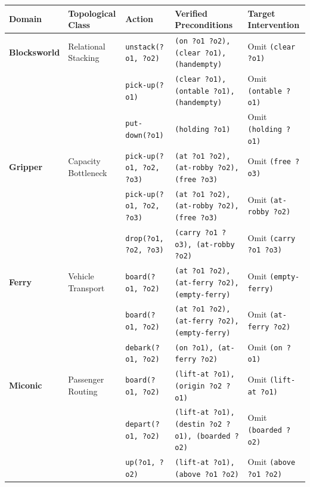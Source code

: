 \documentclass[11pt,a4paper]{article}
\theoremstyle{definition}
\begin{document}
\begin{table}[h!]
\centering
\scriptsize
\begin{tabular}{lllll}
\toprule
\textbf{Domain} & \textbf{Topological Class} & \textbf{Action} & \textbf{Verified Preconditions} & \textbf{Target Intervention} \\
\midrule
\textbf{Blocksworld} & Relational Stacking & \texttt{unstack(?o1, ?o2)} & \texttt{(on ?o1 ?o2), (clear ?o1), (handempty)} & Omit \texttt{(clear ?o1)} \\
                     &                     & \texttt{pick-up(?o1)}       & \texttt{(clear ?o1), (ontable ?o1), (handempty)} & Omit \texttt{(ontable ?o1)} \\
                     &                     & \texttt{put-down(?o1)}      & \texttt{(holding ?o1)}                          & Omit \texttt{(holding ?o1)} \\
\midrule
\textbf{Gripper}     & Capacity Bottleneck & \texttt{pick-up(?o1, ?o2, ?o3)}& \texttt{(at ?o1 ?o2), (at-robby ?o2), (free ?o3)}& Omit \texttt{(free ?o3)} \\
                     &                     & \texttt{pick-up(?o1, ?o2, ?o3)}& \texttt{(at ?o1 ?o2), (at-robby ?o2), (free ?o3)}& Omit \texttt{(at-robby ?o2)} \\
                     &                     & \texttt{drop(?o1, ?o2, ?o3)}& \texttt{(carry ?o1 ?o3), (at-robby ?o2)}        & Omit \texttt{(carry ?o1 ?o3)} \\
\midrule
\textbf{Ferry}       & Vehicle Transport   & \texttt{board(?o1, ?o2)}    & \texttt{(at ?o1 ?o2), (at-ferry ?o2), (empty-ferry)} & Omit \texttt{(empty-ferry)} \\
                     &                     & \texttt{board(?o1, ?o2)}    & \texttt{(at ?o1 ?o2), (at-ferry ?o2), (empty-ferry)} & Omit \texttt{(at-ferry ?o2)} \\
                     &                     & \texttt{debark(?o1, ?o2)}   & \texttt{(on ?o1), (at-ferry ?o2)}               & Omit \texttt{(on ?o1)} \\
\midrule
\textbf{Miconic}     & Passenger Routing   & \texttt{board(?o1, ?o2)}    & \texttt{(lift-at ?o1), (origin ?o2 ?o1)}        & Omit \texttt{(lift-at ?o1)} \\
                     &                     & \texttt{depart(?o1, ?o2)}   & \texttt{(lift-at ?o1), (destin ?o2 ?o1), (boarded ?o2)} & Omit \texttt{(boarded ?o2)} \\
                     &                     & \texttt{up(?o1, ?o2)}       & \texttt{(lift-at ?o1), (above ?o1 ?o2)}         & Omit \texttt{(above ?o1 ?o2)} \\

\end{tabular}
\end{table}
\end{document}
